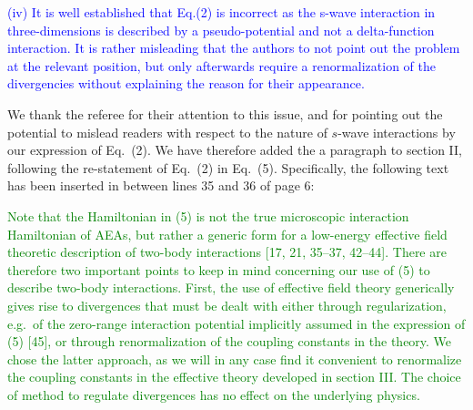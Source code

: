\documentclass[preprint]{revtex4-1}
\newcommand{\1}{\mathds{1}}
\newcommand{\blue}[1]{\textcolor{blue}{#1}}
\newcommand{\green}[1]{\textcolor{green}{#1}}
\begin{document}
\begin{enumerate}
  \blue{(iv) It is well established that Eq.(2) is incorrect as the
    s-wave interaction in three-dimensions is described by a
    pseudo-potential and not a delta-function interaction. It is
    rather misleading that the authors to not point out the problem at
    the relevant position, but only afterwards require a
    renormalization of the divergencies without explaining the reason
    for their appearance.}

  \label{pt:pseudo-potential}

  We thank the referee for their attention to this issue, and for
  pointing out the potential to mislead readers with respect to the
  nature of $s$-wave interactions by our expression of Eq.~(2).  We
  have therefore added the a paragraph to section II, following the
  re-statement of Eq.~(2) in Eq.~(5).  Specifically, the following
  text has been inserted in between lines 35 and 36 of page 6:

  \green{Note that the Hamiltonian in (5) is not the true microscopic
    interaction Hamiltonian of AEAs, but rather a generic form for a
    low-energy effective field theoretic description of two-body
    interactions [17, 21, 35--37, 42--44].  There are therefore two
    important points to keep in mind concerning our use of (5) to
    describe two-body interactions.  First, the use of effective field
    theory generically gives rise to divergences that must be dealt
    with either through regularization, e.g.~of the zero-range
    interaction potential implicitly assumed in the expression of (5)
    [45], or through renormalization of the coupling constants in the
    theory.  We chose the latter approach, as we will in any case find
    it convenient to renormalize the coupling constants in the
    effective theory developed in section III.  The choice of method
    to regulate divergences has no effect on the underlying physics.}


\end{enumerate}
\end{document}
